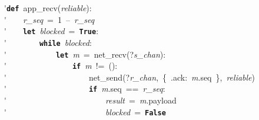 \'\>\texttt{\textbf{def}}~app\_recv(\textit{reliable}):\\

\'\>~~~~\textit{r\_seq}~=~1~--~\textit{r\_seq}\\

\'\>~~~~\texttt{\textbf{let}}~\textit{blocked}~=~\texttt{\textbf{True}}:\\

\'\>~~~~~~~~\texttt{\textbf{while}}~\textit{blocked}:\\

\'\>~~~~~~~~~~~~\texttt{\textbf{let}}~\textit{m}~=~net\_recv(?\textit{s\_chan}):\\

\'\>~~~~~~~~~~~~~~~~\texttt{\textbf{if}}~\textit{m}~!=~():\\

\'\>~~~~~~~~~~~~~~~~~~~~net\_send(?\textit{r\_chan},~\{~.ack:~\textit{m}.seq~\},~\textit{reliable})\\

\'\>~~~~~~~~~~~~~~~~~~~~\texttt{\textbf{if}}~\textit{m}.seq~==~\textit{r\_seq}:\\

\'\>~~~~~~~~~~~~~~~~~~~~~~~~\textit{result}~=~\textit{m}.payload\\

\'\>~~~~~~~~~~~~~~~~~~~~~~~~\textit{blocked}~=~\texttt{\textbf{False}}